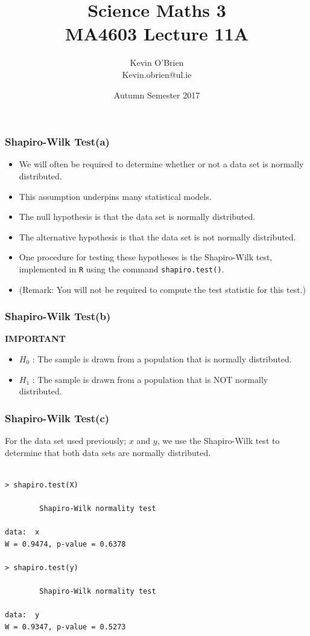 \documentclass[a4]{beamer}
\title[MA4603]{Science Maths 3 \\ {\normalsize MA4603 Lecture 11A}}
\author[Kevin O'Brien]{Kevin O'Brien \\ {\scriptsize Kevin.obrien@ul.ie}}
\date{Autumn Semester 2017}
\institute[Maths \& Stats]{Dept. of Mathematics \& Statistics, \\ University \textit{of} Limerick}
\begin{document}
\begin{frame}
\frametitle{Shapiro-Wilk Test(a)}


\begin{itemize}
\item We will often be required to determine whether or not a data set is normally distributed.
\item This assumption underpins many statistical models.
\item The null hypothesis is that the data set is normally distributed.
\item The alternative hypothesis is that the data set is not normally distributed.
\item One procedure for testing these hypotheses is the Shapiro-Wilk test, implemented in \texttt{R} using the command \texttt{shapiro.test()}.
\item (Remark: You will not be required to compute the test statistic for this test.)
\end{itemize}
\end{frame}
\begin{frame}[fragile]
	\frametitle{Shapiro-Wilk Test(b)}

\textbf{IMPORTANT}
\begin{itemize}
	\item $H_0$ : The sample is drawn from a population that is normally distributed. 
	\item $H_1$ : The sample is drawn from a population that is NOT normally distributed. 
\end{itemize}
	
\end{frame}
\begin{frame}[fragile]
\frametitle{Shapiro-Wilk Test(c)}
For the data set used previously; $x$ and $y$, we use the Shapiro-Wilk test to determine that both data sets are normally distributed.
\begin{verbatim}

> shapiro.test(X)

        Shapiro-Wilk normality test

data:  x
W = 0.9474, p-value = 0.6378

> shapiro.test(y)

        Shapiro-Wilk normality test

data:  y
W = 0.9347, p-value = 0.5273
\end{verbatim}
\end{frame}
\end{document}
